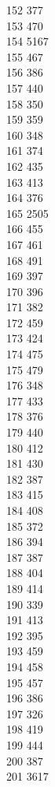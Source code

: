 { 152	377 \\
 153	470 \\
 154	5167 \\
 155	467 \\
 156	386 \\
 157	440 \\
 158	350 \\
 159	359 \\
 160	348 \\
 161	374 \\
 162	435 \\
 163	413 \\
 164	376 \\
 165	2505 \\
 166	455 \\
 167	461 \\
 168	491 \\
 169	397 \\
 170	396 \\
 171	382 \\
 172	459 \\
 173	424 \\
 174	475 \\
 175	479 \\
 176	348 \\
 177	433 \\
 178	376 \\
 179	440 \\
 180	412 \\
 181	430 \\
 182	387 \\
 183	415 \\
 184	408 \\
 185	372 \\
 186	394 \\
 187	387 \\
 188	404 \\
 189	414 \\
 190	339 \\
 191	413 \\
 192	395 \\
 193	459 \\
 194	458 \\
 195	457 \\
 196	386 \\
 197	326 \\
 198	419 \\
 199	444 \\
 200	387 \\
 201	3617 \\
}
